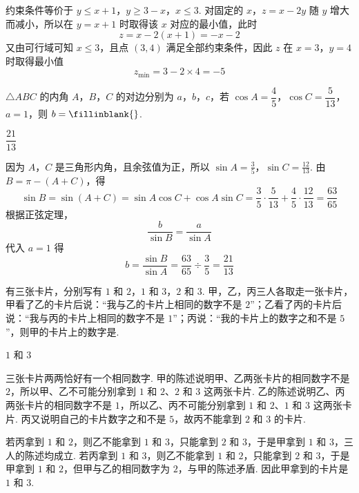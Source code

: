 \begin{solution}
约束条件等价于 \(y\leq x+1\)，\(y\geq3-x\)，\(x\leq3\). 对固定的 \(x\)，\(z=x-2y\) 随 \(y\) 增大而减小，所以在 \(y=x+1\) 时取得该 \(x\) 对应的最小值，此时
\[
z=x-2(x+1)=-x-2
\]
又由可行域可知 \(x\leq3\)，且点 \((3,4)\) 满足全部约束条件，因此 \(z\) 在 \(x=3\)，\(y=4\) 时取得最小值
\[
z_{\min}=3-2\times4=-5
\]
\end{solution}


\begin{problem}
\(\triangle ABC\) 的内角 \(A\)，\(B\)，\(C\) 的对边分别为 \(a\)，\(b\)，\(c\)，若 \(\cos A=\dfrac45\)，\(\cos C=\dfrac{5}{13}\)，\(a=1\)，则 \(b=\fillinblank{}\).
\end{problem}

\begin{answer}
\(\dfrac{21}{13}\)
\end{answer}

\begin{solution}
因为 \(A\)，\(C\) 是三角形内角，且余弦值为正，所以
\(\sin A=\frac35\)，\(\sin C=\frac{12}{13}\).
由 \(B=\pi-(A+C)\)，得
\[
\sin B=\sin(A+C)=\sin A\cos C+\cos A\sin C
=\frac35\cdot\frac5{13}+\frac45\cdot\frac{12}{13}=\frac{63}{65}
\]
根据正弦定理，
\[
\frac{b}{\sin B}=\frac{a}{\sin A}
\]
代入 \(a=1\) 得
\[
b=\frac{\sin B}{\sin A}=\frac{63}{65}\div\frac35=\frac{21}{13}
\]
\end{solution}


\begin{problem}
有三张卡片，分别写有 \(1\) 和 \(2\)，\(1\) 和 \(3\)，\(2\) 和 \(3\). 甲，乙，丙三人各取走一张卡片，甲看了乙的卡片后说：“我与乙的卡片上相同的数字不是 \(2\)”；乙看了丙的卡片后说：“我与丙的卡片上相同的数字不是 \(1\)”；丙说：“我的卡片上的数字之和不是 \(5\)”，则甲的卡片上的数字是\fillinblank{}.
\end{problem}

\begin{answer}
\(1\) 和 \(3\)
\end{answer}

\begin{solution}
三张卡片两两恰好有一个相同数字. 甲的陈述说明甲、乙两张卡片的相同数字不是 \(2\)，所以甲、乙不可能分别拿到 \(1\) 和 \(2\)、\(2\) 和 \(3\) 这两张卡片. 乙的陈述说明乙、丙两张卡片的相同数字不是 \(1\)，所以乙、丙不可能分别拿到 \(1\) 和 \(2\)、\(1\) 和 \(3\) 这两张卡片. 丙又说明自己的卡片数字之和不是 \(5\)，故丙不能拿到 \(2\) 和 \(3\) 的卡片.

若丙拿到 \(1\) 和 \(2\)，则乙不能拿到 \(1\) 和 \(3\)，只能拿到 \(2\) 和 \(3\)，于是甲拿到 \(1\) 和 \(3\)，三人的陈述均成立. 若丙拿到 \(1\) 和 \(3\)，则乙不能拿到 \(1\) 和 \(2\)，只能拿到 \(2\) 和 \(3\)，于是甲拿到 \(1\) 和 \(2\)，但甲与乙的相同数字为 \(2\)，与甲的陈述矛盾. 因此甲拿到的卡片是 \(1\) 和 \(3\).
\end{solution}


